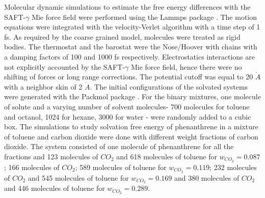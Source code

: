 Molecular dynamic simulations to estimate the free energy differences with the SAFT-$\gamma$ Mie force field were performed using the Lammps package \cite{lammps}. The motion equations were integrated with the velocity-Verlet algorithm \cite{verlet} with a time step of 1 fs. As required by the coarse grained model,  molecules were treated as rigid bodies. The thermostat and the barostat were the Nose/Hoover with chains with a damping factors of 100 and 1000 fs respectively. Electrostatics interactions are not explicitly accounted by the SAFT-$\gamma$ Mie force field, hence there were no shifting of forces or long range corrections. The potential cutoff was equal to 20 $\dot{A}$ \cite{muller2017} with a neighbor skin of 2 $\dot{A}$. The initial configurations of the  solvated systems were generated with the Packmol package \cite{packmol}. For the binary mixtures, one molecule of solute and a varying number of solvent molecules- 700 molecules for toluene and octanol, 1024 for hexane, 3000 for water - were randomly added to a cubic box. The simulations to study solvation free energy of phenanthrene in a mixture of toluene and carbon dioxide were done with different weight fractions of carbon dioxide. The  system consisted of one molecule of phenanthrene for all the fractions and 123 molecules of $CO_{2}$ and 618 molecules of toluene for $w_{CO_{2}} = 0.087$; 166 molecules of $CO_{2}$; 589 molecules of toluene for $w_{CO_{2}} = 0.119$; 232 molecules of $CO_{2}$ and 545 molecules of toluene for $w_{CO_{2}} = 0.169$ and 380 molecules of $CO_{2}$ and 446 molecules of toluene for $w_{CO_{2}} = 0.289$.

